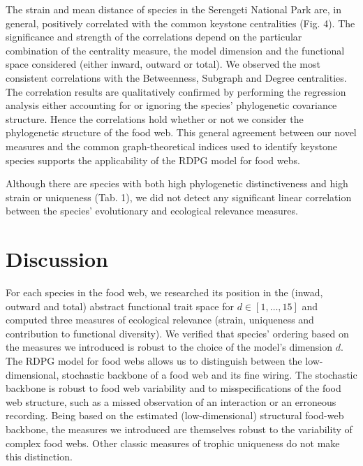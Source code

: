 \documentclass[12pt]{article}
\begin{document}
The strain and mean distance of species in the Serengeti National Park are, in
general, positively correlated with the common keystone centralities (Fig. 4).
The significance and strength of the correlations depend on the particular
combination of the centrality measure, the  model dimension and the functional space
considered (either inward, outward or total). We observed the most consistent
correlations with the Betweenness, Subgraph and Degree centralities.
The correlation results are qualitatively confirmed by performing the regression analysis
either accounting for or ignoring the species' phylogenetic covariance structure. Hence
the correlations hold whether or not we consider the phylogenetic structure
of the food web. This general agreement between our novel measures and the common graph-theoretical
indices used to identify keystone species supports the applicability of the RDPG model for food
webs. 

Although there are species with both high phylogenetic distinctiveness and high
strain or uniqueness (Tab. 1), we did not detect any significant linear
correlation between the species' evolutionary and ecological relevance measures.


 \section{Discussion}

For each species in the food web, we researched its position in the (inwad, outward and
total) abstract functional trait space for $d \in \left[ 1, \dots, 15\right]$
and computed three measures of ecological relevance (strain, uniqueness and
contribution to functional diversity). We verified that species' ordering
based on the measures we introduced is robust to the choice of the model's dimension
$d$. The RDPG model for food webs allows us to distinguish between the low-dimensional,
stochastic backbone of a food web and its fine wiring. The
stochastic backbone is robust to food web variability and to misspecifications
of the food web structure, such as a missed observation of an interaction or
an erroneous recording.  Being based on the estimated (low-dimensional)
structural food-web backbone, the measures we introduced are themselves robust
to the variability of complex food webs. Other classic measures of trophic
uniqueness \citep{yodzis1999search,luczkovich2003defining,jordan2009trophic} do
not make this distinction.
\end{document}
